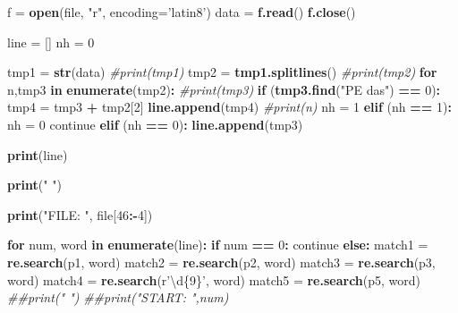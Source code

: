 \documentclass[
  12pt,
]{article}
\newenvironment{Shaded}{\begin{snugshade}}{\end{snugshade}}
\newcommand{\CommentTok}[1]{\textcolor[rgb]{0.56,0.35,0.01}{\textit{#1}}}
\newcommand{\ControlFlowTok}[1]{\textcolor[rgb]{0.13,0.29,0.53}{\textbf{#1}}}
\newcommand{\DataTypeTok}[1]{\textcolor[rgb]{0.13,0.29,0.53}{#1}}
\newcommand{\DecValTok}[1]{\textcolor[rgb]{0.00,0.00,0.81}{#1}}
\newcommand{\KeywordTok}[1]{\textcolor[rgb]{0.13,0.29,0.53}{\textbf{#1}}}
\newcommand{\NormalTok}[1]{#1}
\newcommand{\OperatorTok}[1]{\textcolor[rgb]{0.81,0.36,0.00}{\textbf{#1}}}
\newcommand{\StringTok}[1]{\textcolor[rgb]{0.31,0.60,0.02}{#1}}
\begin{document}
\begin{Shaded}
\begin{Highlighting}[]
\StringTok{    }\NormalTok{f =}\StringTok{ }\KeywordTok{open}\NormalTok{(file, }\StringTok{"r"}\NormalTok{, }\DataTypeTok{encoding=}\StringTok{'latin8'}\NormalTok{)}
\NormalTok{    data =}\StringTok{ }\KeywordTok{f.read}\NormalTok{()}
    \KeywordTok{f.close}\NormalTok{()}

\NormalTok{    line =}\StringTok{ }\NormalTok{[]}
\NormalTok{    nh =}\StringTok{ }\DecValTok{0}

\NormalTok{    tmp1 =}\StringTok{ }\KeywordTok{str}\NormalTok{(data)}
    \CommentTok{#print(tmp1)}
\NormalTok{    tmp2 =}\StringTok{ }\KeywordTok{tmp1.splitlines}\NormalTok{()}
    \CommentTok{#print(tmp2)}
    \ControlFlowTok{for}\NormalTok{ n,tmp3 }\ControlFlowTok{in} \KeywordTok{enumerate}\NormalTok{(tmp2)}\OperatorTok{:}
\StringTok{        }\CommentTok{#print(tmp3)}
\StringTok{        }\ControlFlowTok{if}\NormalTok{ (}\KeywordTok{tmp3.find}\NormalTok{(}\StringTok{"PE das"}\NormalTok{) }\OperatorTok{==}\StringTok{ }\DecValTok{0}\NormalTok{)}\OperatorTok{:}
\StringTok{            }\NormalTok{tmp4 =}\StringTok{ }\NormalTok{tmp3 }\OperatorTok{+}\StringTok{ }\NormalTok{tmp2[}\DecValTok{2}\NormalTok{]}
            \KeywordTok{line.append}\NormalTok{(tmp4)}
            \CommentTok{#print(n)}
\NormalTok{            nh =}\StringTok{ }\DecValTok{1}
        \KeywordTok{elif}\NormalTok{ (nh }\OperatorTok{==}\StringTok{ }\DecValTok{1}\NormalTok{)}\OperatorTok{:}
\StringTok{            }\NormalTok{nh =}\StringTok{ }\DecValTok{0}
\NormalTok{            continue}
        \KeywordTok{elif}\NormalTok{ (nh }\OperatorTok{==}\StringTok{ }\DecValTok{0}\NormalTok{)}\OperatorTok{:}
\StringTok{            }\KeywordTok{line.append}\NormalTok{(tmp3)}

    \KeywordTok{print}\NormalTok{(line)}

    \KeywordTok{print}\NormalTok{(}\StringTok{"   "}\NormalTok{)}
    
    \KeywordTok{print}\NormalTok{(}\StringTok{"FILE: "}\NormalTok{, file[}\DecValTok{46}\OperatorTok{:-}\DecValTok{4}\NormalTok{])}

    \ControlFlowTok{for}\NormalTok{ num, word }\ControlFlowTok{in} \KeywordTok{enumerate}\NormalTok{(line)}\OperatorTok{:}
\StringTok{            }\ControlFlowTok{if}\NormalTok{ num }\OperatorTok{==}\StringTok{ }\DecValTok{0}\OperatorTok{:}
\StringTok{                }\NormalTok{continue}
            \ControlFlowTok{else}\OperatorTok{:}
\StringTok{                }\NormalTok{match1 =}\StringTok{ }\KeywordTok{re.search}\NormalTok{(p1, word)}
\NormalTok{                match2 =}\StringTok{ }\KeywordTok{re.search}\NormalTok{(p2, word)}
\NormalTok{                match3 =}\StringTok{ }\KeywordTok{re.search}\NormalTok{(p3, word)}
\NormalTok{                match4 =}\StringTok{ }\KeywordTok{re.search}\NormalTok{(r}\StringTok{'\textbackslash{}d\{9\}'}\NormalTok{, word)}
\NormalTok{                match5 =}\StringTok{ }\KeywordTok{re.search}\NormalTok{(p5, word)}
                \CommentTok{##print("   ")}
                \CommentTok{##print("START: ",num)}


\end{Highlighting}
\end{Shaded}
\end{document}
